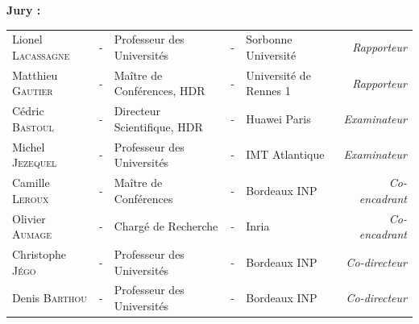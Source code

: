 \documentclass[a4paper, 11pt]{article}
\begin{document}
  \noindent \large \textbf{Jury :} \\
  \vspace*{-1.5em}
  \begin{center}
    \begin{tabular}{lclclr}
      Lionel     \textsc{Lacassagne} & - & Professeur des Universités  & - & Sorbonne Université    & \textit{Rapporteur}   \\
      Matthieu   \textsc{Gautier}    & - & Maître de Conférences, HDR  & - & Université de Rennes 1 & \textit{Rapporteur}   \\
      Cédric     \textsc{Bastoul}    & - & Directeur Scientifique, HDR & - & Huawei Paris           & \textit{Examinateur}  \\
      Michel     \textsc{Jezequel}   & - & Professeur des Universités  & - & IMT Atlantique         & \textit{Examinateur}  \\
      Camille    \textsc{Leroux}     & - & Maître de Conférences       & - & Bordeaux INP           & \textit{Co-encadrant} \\
      Olivier    \textsc{Aumage}     & - & Chargé de Recherche         & - & Inria                  & \textit{Co-encadrant} \\
      Christophe \textsc{Jégo}       & - & Professeur des Universités  & - & Bordeaux INP           & \textit{Co-directeur} \\
      Denis      \textsc{Barthou}    & - & Professeur des Universités  & - & Bordeaux INP           & \textit{Co-directeur} \\
    \end{tabular}
  \end{center}
\end{document}
